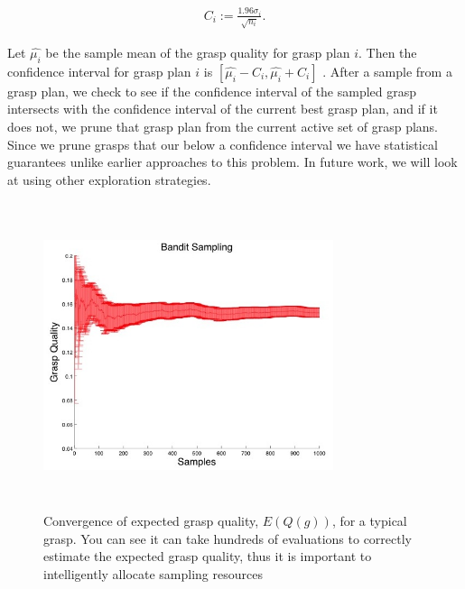 \documentclass[letterpaper, 10 pt, conference]{ieeeconf}  %
\begin{document}
\vspace{-2ex}
\begin{align}
C_{ i} := \frac{1.96 \sigma_i}{\sqrt{n_i}}.
\end{align}

Let $\hat{\mu_i}$ be the sample mean of the grasp quality for grasp plan $i$.
Then the confidence interval for grasp plan $i$ is $[\hat{\mu_i} - C_i, \hat{\mu_i} + C_i]$ \cite{caflisch1998monte}.  
After a sample from a grasp plan, we check to see if the confidence interval of the sampled grasp intersects with the confidence interval of the current best grasp plan, and if it does not, we prune that grasp plan from the current active set of  grasp plans. Since we prune grasps that our below a confidence interval we have statistical guarantees unlike earlier approaches to this problem\cite{kehoe2012toward}. In future work, we will look at using other exploration strategies. 




\begin{figure}[ht!]
\centering
\includegraphics[width=8.5cm,height=9cm]{figures/Slide11.jpg}
\caption{ \footnotesize Convergence of expected grasp quality, $E(Q(g))$,  for a typical grasp. You can see it can take hundreds of evaluations to correctly estimate the expected grasp quality, thus it is important to  intelligently allocate sampling resources}
\vspace*{-10pt}
\label{fig:sampling_convergence}
\end{figure} 
\end{document}
